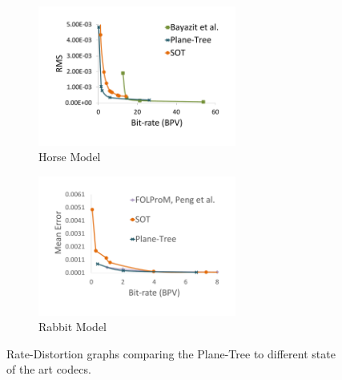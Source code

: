 \begin{figure}[!htb]
        \begin{subfigure}[b]{6.8cm}
                \includegraphics[width=6.5cm]{images/results/compression/horsesota}
                \caption{Horse Model}
                \label{fig:SA_HORSE}
        \end{subfigure}%
        \begin{subfigure}[b]{6.8cm}
                \includegraphics[width=6.5cm]{images/results/compression/rabbitsota}
                \caption{Rabbit Model}
                \label{fig:SA_RABBIT}
        \end{subfigure}
       \caption{Rate-Distortion graphs comparing the Plane-Tree to different state of the art codecs.}
       \label{fig:SOTAEXPS}
\end{figure}